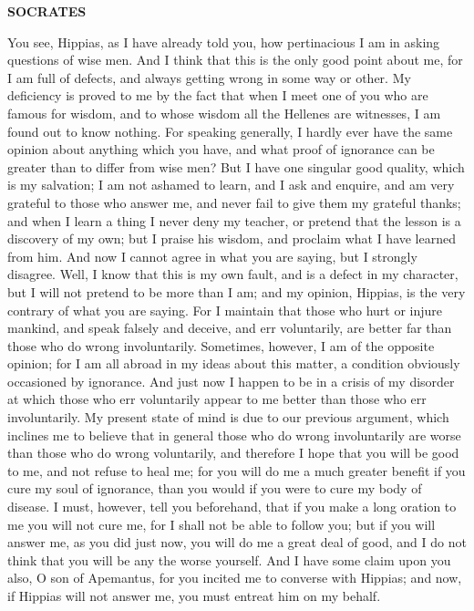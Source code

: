 \documentclass[11pt,letter]{article}
\begin{document}
\par \textbf{SOCRATES}
\par   You see, Hippias, as I have already told you, how pertinacious I am in asking questions of wise men. And I think that this is the only good point about me, for I am full of defects, and always getting wrong in some way or other. My deficiency is proved to me by the fact that when I meet one of you who are famous for wisdom, and to whose wisdom all the Hellenes are witnesses, I am found out to know nothing. For speaking generally, I hardly ever have the same opinion about anything which you have, and what proof of ignorance can be greater than to differ from wise men? But I have one singular good quality, which is my salvation; I am not ashamed to learn, and I ask and enquire, and am very grateful to those who answer me, and never fail to give them my grateful thanks; and when I learn a thing I never deny my teacher, or pretend that the lesson is a discovery of my own; but I praise his wisdom, and proclaim what I have learned from him. And now I cannot agree in what you are saying, but I strongly disagree. Well, I know that this is my own fault, and is a defect in my character, but I will not pretend to be more than I am; and my opinion, Hippias, is the very contrary of what you are saying. For I maintain that those who hurt or injure mankind, and speak falsely and deceive, and err voluntarily, are better far than those who do wrong involuntarily. Sometimes, however, I am of the opposite opinion; for I am all abroad in my ideas about this matter, a condition obviously occasioned by ignorance. And just now I happen to be in a crisis of my disorder at which those who err voluntarily appear to me better than those who err involuntarily. My present state of mind is due to our previous argument, which inclines me to believe that in general those who do wrong involuntarily are worse than those who do wrong voluntarily, and therefore I hope that you will be good to me, and not refuse to heal me; for you will do me a much greater benefit if you cure my soul of ignorance, than you would if you were to cure my body of disease. I must, however, tell you beforehand, that if you make a long oration to me you will not cure me, for I shall not be able to follow you; but if you will answer me, as you did just now, you will do me a great deal of good, and I do not think that you will be any the worse yourself. And I have some claim upon you also, O son of Apemantus, for you incited me to converse with Hippias; and now, if Hippias will not answer me, you must entreat him on my behalf.
\end{document}
